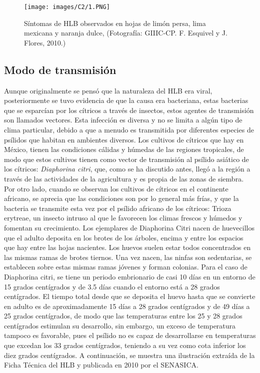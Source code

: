 \begin{figure}[H]
\centering
\texttt{[image: images/C2/1.PNG]}
\caption{Síntomas de HLB observados en hojas de limón persa, lima mexicana y naranja dulce, (Fotografía: GIIIC-CP. F. Esquivel y J. Flores, 2010.)}
\end{figure}

\subsection{Modo de transmisión}
Aunque originalmente se pensó que la naturaleza del HLB era viral, posteriormente se tuvo evidencia de que la causa era bacteriana, estas bacterias que se esparcían por los cítricos a través de insectos, estos agentes de transmisión son llamados vectores. Esta infección es diversa y no se limita a algún tipo de clima particular, debido a que a menudo es transmitida por diferentes especies de psílidos que habitan en ambientes diversos. Los cultivos de cítricos que hay en México, tienen las condiciones cálidas y húmedas de las regiones tropicales, de modo que estos cultivos tienen como vector de transmisión al psílido asiático de los cítricos: \textit{Diaphorina citri}, que, como se ha discutido antes, llegó a la región a través de las actividades de la agricultura y es propia de las zonas de siembra.\\

Por otro lado, cuando se observan los cultivos de cítricos en el continente africano, se aprecia que las condiciones son por lo general más frías, y que la bacteria se transmite esta vez por el psílido africano de los cítricos: Trioza erytreae, un insecto intruso al que le favorecen los climas frescos y húmedos y fomentan su crecimiento. Los ejemplares de  Diaphorina Citri nacen de huevecillos que el adulto deposita en los brotes de los árboles, encima y entre los espacios que hay entre las hojas nacientes. Los huevos suelen estar todos concentrados en las mismas ramas de brotes tiernos. Una vez nacen, las ninfas son sedentarias, se establecen sobre estas mismas ramas jóvenes y forman colonias. Para el caso de   Diaphorina citri, se  tiene un periodo embrionario de casi 10 días en un entorno de 15 grados centígrados y de 3.5 días cuando el entorno está a 28 grados centígrados. El tiempo total desde que se deposita el huevo hasta que se convierte en adulto es de aproximadamente 15 días a 28 grados centígrados  y de 49 días a 25 grados centígrados, de modo que las temperaturas entre los 25 y 28 grados centígrados estimulan su desarrollo, sin embargo, un exceso de temperatura tampoco es favorable, pues el psílido no es capaz de desarrollarse en temperaturas que excedan los 33 grados centígrados, teniendo a su vez como cota inferior los diez grados centígrados. A continuación, se muestra una ilustración extraída de la Ficha Técnica del HLB y publicada en 2010 por el SENASICA.

